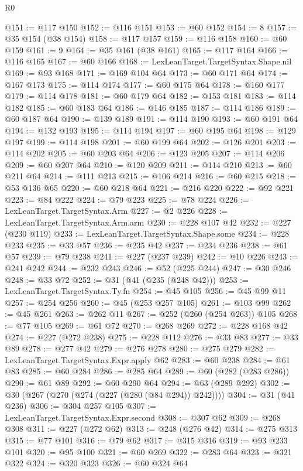 \begin{lexlean}{R0}
\begin{coremodule}
@151 := @117 @150
@152 := @116 @151
@153 := @60 @152
@154 := 8
@157 := @35 @154 (@38 @154)
@158 := @117 @157
@159 := @116 @158
@160 := @60 @159
@161 := 9
@164 := @35 @161 (@38 @161)
@165 := @117 @164
@166 := @116 @165
@167 := @60 @166
@168 := LexLeanTarget.TargetSyntax.Shape.nil
@169 := @93 @168
@171 := @169 @104 @64
@173 := @60 @171 @64
@174 := @167 @173
@175 := @114 @174
@177 := @60 @175 @64
@178 := @160 @177
@179 := @114 @178
@181 := @60 @179 @64
@182 := @153 @181
@183 := @114 @182
@185 := @60 @183 @64
@186 := @146 @185
@187 := @114 @186
@189 := @60 @187 @64
@190 := @139 @189
@191 := @114 @190
@193 := @60 @191 @64
@194 := @132 @193
@195 := @114 @194
@197 := @60 @195 @64
@198 := @129 @197
@199 := @114 @198
@201 := @60 @199 @64
@202 := @126 @201
@203 := @114 @202
@205 := @60 @203 @64
@206 := @123 @205
@207 := @114 @206
@209 := @60 @207 @64
@210 := @120 @209
@211 := @114 @210
@213 := @60 @211 @64
@214 := @111 @213
@215 := @106 @214
@216 := @60 @215
@218 := @53 @136 @65
@220 := @60 @218 @64
@221 := @216 @220
@222 := @92 @221
@223 := @84 @222
@224 := @79 @223
@225 := @78 @224
@226 := LexLeanTarget.TargetSyntax.Arm
@227 := @2 @226
@228 := LexLeanTarget.TargetSyntax.Arm.arm
@230 := @228 @107 @42
@232 := @227 (@230 @119)
@233 := LexLeanTarget.TargetSyntax.Shape.some
@234 := @228 @233
@235 := @33 @57
@236 := @235 @42
@237 := @234 @236
@238 := @61 @57
@239 := @79 @238
@241 := @227 (@237 @239)
@242 := @10 @226
@243 := @241 @242
@244 := @232 @243
@246 := @52 (@225 @244)
@247 := @30 @246
@248 := @33 @72
@252 := @31 (@41 (@235 (@248 @42)))
@253 := LexLeanTarget.TargetSyntax.Ty.fn
@254 := @45 @105
@256 := @45 @99 @11
@257 := @254 @256
@260 := @45 (@253 @257 @105)
@261 := @103 @99
@262 := @45 @261
@263 := @262 @11
@267 := @252 (@260 (@254 @263)) @105
@268 := @77 @105
@269 := @61 @72
@270 := @268 @269
@272 := @228 @168 @42
@274 := @227 (@272 @238)
@275 := @228 @112
@276 := @33 @83
@277 := @33 @89
@278 := @277 @42
@279 := @276 @278
@280 := @275 @279
@282 := LexLeanTarget.TargetSyntax.Expr.apply @62
@283 := @60 @238
@284 := @61 @83
@285 := @60 @284
@286 := @285 @64
@289 := @60 (@282 (@283 @286))
@290 := @61 @89
@292 := @60 @290 @64
@294 := @63 (@289 @292)
@302 := @30 (@267 (@270 (@274 (@227 (@280 (@84 @294)) @242))))
@304 := @31 (@41 @236)
@306 := @304 @257 @105
@307 := LexLeanTarget.TargetSyntax.Expr.second
@308 := @307 @62
@309 := @268 @308
@311 := @227 (@272 @62)
@313 := @248 (@276 @42)
@314 := @275 @313
@315 := @77 @101
@316 := @79 @62
@317 := @315 @316
@319 := @93 @233 @101
@320 := @95 @100
@321 := @60 @269
@322 := @283 @64
@323 := @321 @322
@324 := @320 @323
@326 := @60 @324 @64

\end{coremodule}
\end{lexlean}
